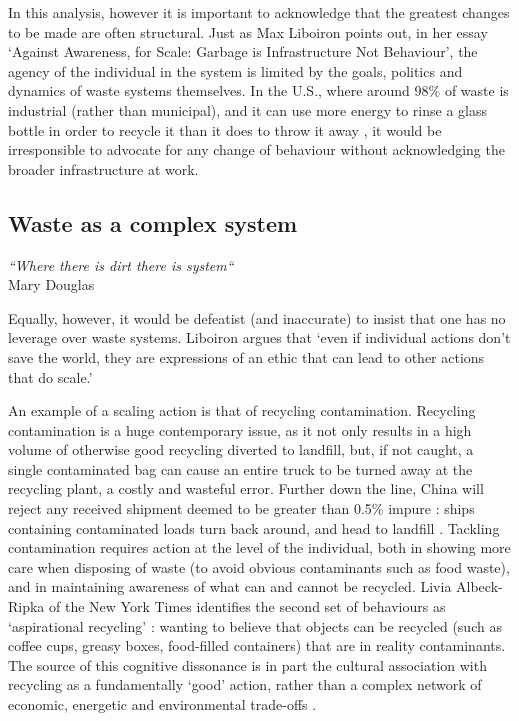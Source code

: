 \documentclass[nofonts,nols,justified,nobib]{tufte-book}
\begin{document}
In this analysis, however it is important to acknowledge that the greatest changes to be made are often structural. Just as Max Liboiron points out, in her essay `Against Awareness, for Scale: Garbage is Infrastructure Not Behaviour', the agency of the individual in the system is limited by the goals, politics and dynamics of waste systems themselves. In the U.S., where around 98\% of waste is industrial (rather than municipal)\cite{liboiron_against_2014}, and it can use more energy to rinse a glass bottle in order to recycle it than it does to throw it away \cite{tierney_reign_2018}, it would be irresponsible to advocate for any change of behaviour without acknowledging the broader infrastructure at work.

\subsection*{Waste as a complex system}

\begin{flushright}
\emph{``Where there is dirt there is system``} \cite{douglas_purity_1966}\\
Mary Douglas 
\end{flushright}

Equally, however, it would be defeatist (and inaccurate) to insist that one has no leverage over waste systems. Liboiron argues that `even if individual actions don't save the world, they are expressions of an ethic that can lead to other actions that do scale.'\cite{liboiron_against_2014}

An example of a scaling action is that of recycling contamination. Recycling contamination is a huge contemporary issue, as it not only results in a high volume of otherwise good recycling diverted to landfill, but, if not caught, a single contaminated bag can cause an entire truck to be turned away at the recycling plant, a costly and wasteful error. Further down the line, China will reject any received shipment deemed to be greater than 0.5\% impure \cite{casella_recycle_2018}: ships containing contaminated loads turn back around, and head to landfill \cite{albeck-ripka_your_2018}. Tackling contamination requires action at the level of the individual, both in showing more care when disposing of waste (to avoid obvious contaminants such as food waste), and in maintaining awareness of what can and cannot be recycled. Livia Albeck-Ripka of the New York Times identifies the second set of behaviours as `aspirational recycling' \cite{albeck-ripka_6_2018}: wanting to believe that objects can be recycled (such as coffee cups, greasy boxes, food-filled containers) that are in reality contaminants. The source of this cognitive dissonance is in part the cultural association with recycling as a fundamentally `good' action, rather than a complex network of economic, energetic and environmental trade-offs \cite{tierney_reign_2018}.
\end{document}
